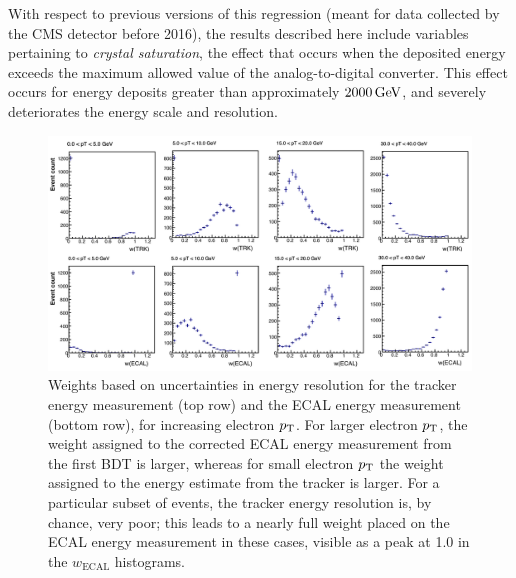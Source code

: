 With respect to previous versions of this regression (meant for data collected by the CMS detector before 2016), the results described here include variables pertaining to \textit{crystal saturation}, the effect that occurs when the deposited energy exceeds the maximum allowed value of the analog-to-digital converter.
% 
This effect occurs for energy deposits greater than approximately $2000\,\text{GeV}$, and severely deteriorates the energy scale and resolution.



\begin{figure}[hbtp]
  \begin{center}
    \includegraphics[width=0.99\linewidth]{img/regression/weightplot.pdf}
    \caption{
        Weights based on uncertainties in energy resolution for the tracker energy measurement (top row) and the ECAL energy measurement (bottom row), for increasing electron $p_\mathrm{T}$.
        For larger electron $p_\mathrm{T}$, the weight assigned to the corrected ECAL energy measurement from the first BDT is larger, whereas for small electron $p_\mathrm{T}$ the weight assigned to the energy estimate from the tracker is larger.
        For a particular subset of events, the tracker energy resolution is, by chance, very poor; this leads to a nearly full weight placed on the ECAL energy measurement in these cases, visible as a peak at 1.0 in the $w_\text{ECAL}$ histograms.
        }
    \label{fig:regressionweights}
  \end{center}
\end{figure}

